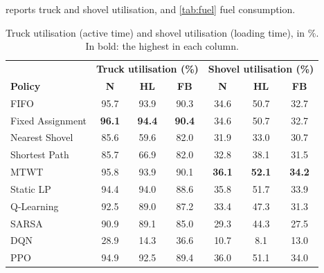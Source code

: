 \documentclass[11pt,a4paper]{article}
\newif\ifrevmarks
\newcommand{\revtag}[1]{\ifrevmarks\textsuperscript{\textcolor{red!70!black}{\scriptsize[#1]}}\fi}
\newenvironment{revbloc}[1]{\par\ifrevmarks\color{revcolor}\noindent\revtag{#1}\ \fi}{\par}
\newif\ifcorrmarks
\newcommand{\corr}[1]{\ifcorrmarks\textcolor{corrcolor}{#1}\else#1\fi}
\begin{document}
\begin{revbloc}{T31}
 reports truck and shovel utilisation, and \cref{tab:fuel} fuel consumption.

\begin{table}[H]
\centering
\caption{Truck utilisation (active time) and shovel utilisation (loading time), in \%. In bold: the highest in each column.}
\label{tab:efficiency}
\footnotesize\setlength{\tabcolsep}{4pt}
\begin{tabular}{lccc|ccc}
\toprule
 & \multicolumn{3}{c|}{\textbf{Truck utilisation (\%)}} & \multicolumn{3}{c}{\textbf{Shovel utilisation (\%)}} \\
\textbf{Policy} & \textbf{N} & \textbf{HL} & \textbf{FB} & \textbf{N} & \textbf{HL} & \textbf{FB} \\
\midrule
FIFO                 & 95.7 & 93.9 & 90.3 & 34.6 & 50.7 & 32.7 \\
Fixed Assignment     & \textbf{96.1} & \textbf{94.4} & \textbf{90.4} & 34.6 & 50.7 & 32.7 \\
Nearest Shovel       & 85.6 & 59.6 & 82.0 & 31.9 & 33.0 & 30.7 \\
Shortest Path        & 85.7 & 66.9 & 82.0 & 32.8 & 38.1 & 31.5 \\
MTWT                 & 95.8 & 93.9 & 90.1 & \textbf{36.1} & \textbf{52.1} & \textbf{34.2} \\
\corr{Static LP}                   & 94.4 & 94.0 & 88.6 & 35.8 & 51.7 & 33.9 \\
\midrule
Q-Learning           & 92.5 & 89.0 & 87.2 & 33.4 & 47.3 & 31.3 \\
SARSA                & 90.9 & 89.1 & 85.0 & 29.3 & 44.3 & 27.5 \\
DQN                  & 28.9 & 14.3 & 36.6 & 10.7 & 8.1 & 13.0 \\
PPO                  & 94.9 & 92.5 & 89.4 & 36.0 & 51.1 & 34.0 \\
\bottomrule
\end{tabular}
\end{table}


\end{revbloc}
\end{document}
